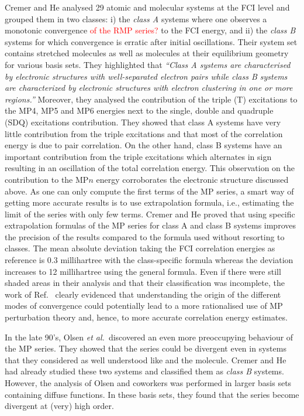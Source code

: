 \documentclass[aps,prb,reprint,noshowkeys,linenumbers,superscriptaddress]{revtex4-1}
\newcommand{\titou}[1]{\textcolor{red}{#1}}
\newcommand{\hugh}[1]{\textcolor{hughgreen}{#1}}
\newcommand{\latin}[1]{#1}
\newcommand{\ie}{\latin{i.e.}}
\begin{document}
\hugh{Cremer and He analysed 29 atomic and molecular systems at the FCI level \cite{Cremer_1996} and grouped them in two classes: i) the \textit{class A} systems where one observes a monotonic convergence \titou{of the RMP series?} to the FCI energy, and ii) the \textit{class B} systems for which convergence is erratic after initial oscillations. 
Their system set contains stretched molecules as well as molecules at their equilibrium geometry for various basis sets. 
They highlighted that \cite{Cremer_1996}
\textit{``Class A systems are characterised by electronic structures with well-separated electron pairs while class B systems are characterized by electronic structures with electron clustering in one or more regions.''}
Moreover, they analysed the contribution of the triple (T) excitations to the MP4, MP5 and MP6 energies next to the single, double and quadruple (SDQ) excitations contribution.
They showed that class A systems have very little contribution from the triple excitations and that most of the correlation energy is due to pair correlation. 
On the other hand, class B systems have an important contribution from the triple excitations which alternates in sign resulting in an oscillation of the total correlation energy.
This observation on the contribution to the MP$n$ energy corroborates the electronic structure discussed above.
As one can only compute the first terms of the MP series, a smart way of getting more accurate results is to use extrapolation formula, \ie, estimating the limit of the series with only few terms. 
Cremer and He proved that using specific extrapolation formulas of the MP series for class A and class B systems improves the precision of the results compared to the formula used without resorting to classes. \cite{Cremer_1996}
The mean absolute deviation taking the FCI correlation energies as reference is $0.3$ millihartree with the class-specific formula whereas the deviation increases to 12 millihartree using the general formula.  
Even if there were still shaded areas in their analysis and that their classification was incomplete, the work of Ref.~\onlinecite{Cremer_1996} clearly evidenced that understanding the origin of the different modes of convergence could potentially lead to a more rationalised use of MP perturbation theory and, hence, to more accurate correlation energy estimates.}


In the late 90's, Olsen \textit{et al.}~discovered an even more preoccupying behaviour of the MP series. \cite{Olsen_1996} 
They showed that the series could be divergent even in systems that they considered as well understood like  and the  molecule. \cite{Olsen_1996, Christiansen_1996} 
Cremer and He had already studied these two systems and classified them as \textit{class B} systems. 
However, the analysis of Olsen and coworkers was performed in larger basis sets containing diffuse functions. 
In these basis sets, they found that the series become divergent at (very) high order.
\end{document}
